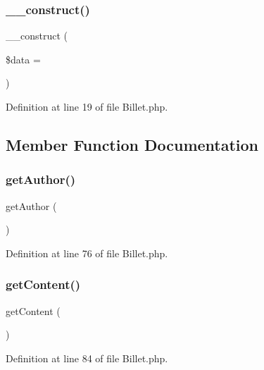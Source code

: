 \subsubsection{\+\_\+\+\_\+construct()}
{\footnotesize\ttfamily \+\_\+\+\_\+construct (\begin{DoxyParamCaption}\item[{}]{\$data = {\ttfamily []} }\end{DoxyParamCaption})}



Definition at line 19 of file Billet.\+php.



\subsection{Member Function Documentation}
\mbox{\label{class_src_1_1_entity_1_1_billet_a5286e30390ae3e1b274940286493dd24}} 
\subsubsection{get\+Author()}
{\footnotesize\ttfamily get\+Author (\begin{DoxyParamCaption}{ }\end{DoxyParamCaption})}



Definition at line 76 of file Billet.\+php.

\mbox{\label{class_src_1_1_entity_1_1_billet_a58e43f09a06ce4e29b192c4e17ce7915}} 
\subsubsection{get\+Content()}
{\footnotesize\ttfamily get\+Content (\begin{DoxyParamCaption}{ }\end{DoxyParamCaption})}



Definition at line 84 of file Billet.\+php.

\mbox{\label{class_src_1_1_entity_1_1_billet_ae5e6c0bedcef3f514100c20ee92c901a}} 
